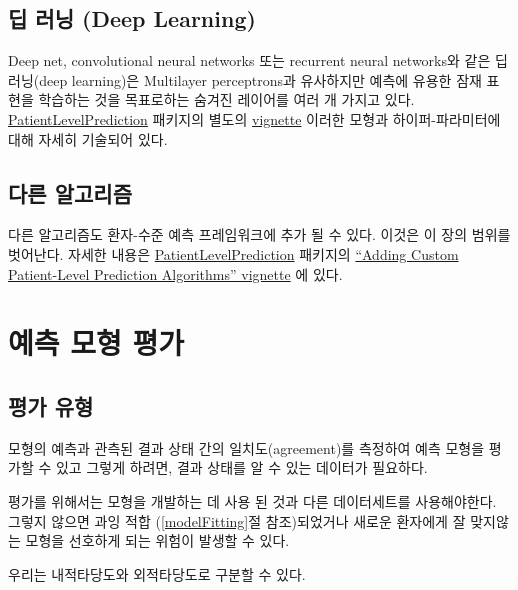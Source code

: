 \documentclass[11pt]{book}
\theoremstyle{definition}
\theoremstyle{definition}
\theoremstyle{definition}
\theoremstyle{remark}
\let\BeginKnitrBlock\begin \let\EndKnitrBlock\end
\begin{document}
\subsection{딥 러닝 (Deep Learning)}\label{--deep-learning}

Deep net, convolutional neural networks 또는 recurrent neural networks와
같은 딥 러닝(deep learning)은 Multilayer perceptrons과 유사하지만 예측에
유용한 잠재 표현을 학습하는 것을 목표로하는 숨겨진 레이어를 여러 개
가지고 있다.
\href{https://ohdsi.github.io/PatientLevelPrediction/}{PatientLevelPrediction}
패키지의 별도의
\href{https://ohdsi.github.io/PatientLevelPrediction/articles/BuildingDeepLearningModels.html}{vignette}
이러한 모형과 하이퍼-파라미터에 대해 자세히 기술되어
있다. 

\subsection{다른 알고리즘}\label{-}

다른 알고리즘도 환자-수준 예측 프레임워크에 추가 될 수 있다. 이것은 이
장의 범위를 벗어난다. 자세한 내용은
\href{https://ohdsi.github.io/PatientLevelPrediction/}{PatientLevelPrediction}
패키지의
\href{https://ohdsi.github.io/PatientLevelPrediction/articles/AddingCustomAlgorithms.html}{``Adding
Custom Patient-Level Prediction Algorithms'' vignette} 에 있다.

\section{예측 모형 평가}\label{--}

\subsection{평가 유형}\label{-}

모형의 예측과 관측된 결과 상태 간의 일치도(agreement)를 측정하여 예측
모형을 평가할 수 있고 그렇게 하려면, 결과 상태를 알 수 있는 데이터가
필요하다. 

\BeginKnitrBlock{rmdimportant}
평가를 위해서는 모형을 개발하는 데 사용 된 것과 다른 데이터세트를
사용해야한다. 그렇지 않으면 과잉 적합 (\ref{modelFitting}절
참조)되었거나 새로운 환자에게 잘 맞지않는 모형을 선호하게 되는 위험이
발생할 수 있다.
\EndKnitrBlock{rmdimportant}

우리는 내적타당도와 외적타당도로 구분할 수 있다.
\end{document}
